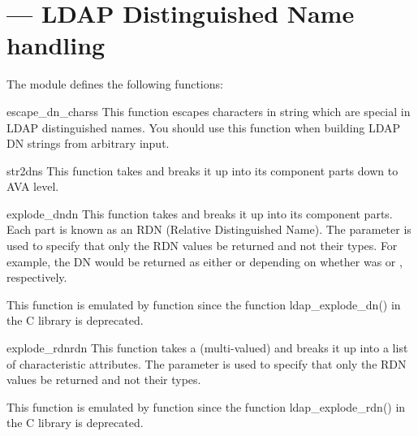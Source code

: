 
\section{ ---
  LDAP Distinguished Name handling }




\begin{seealso}
\end{seealso}

The  module defines the following functions:

\begin{funcdesc}{escape_dn_chars}{s} %
  This function escapes characters in string  which
  are special in LDAP distinguished names. You should use this function when
  building LDAP DN strings from arbitrary input.
\end{funcdesc}

\begin{funcdesc}{str2dn}{s} %
  This function takes  and breaks it up into its component parts
  down to AVA level.
\end{funcdesc}


\begin{funcdesc}{explode_dn}{dn } %
  This function takes  and breaks it up into its component parts. 
  Each part is known as an RDN (Relative Distinguished Name). The
   parameter is used to specify that only the RDN values be 
  returned and not their types.
  For example, the DN  would be
  returned as either \code{["cn=Bob", "c=US"]} or \code{["Bob","US"]}
  depending on whether  was  or ,
  respectively.

  This function is emulated by function 
  since the function ldap_explode_dn() in the C library is deprecated.
\end{funcdesc}

\begin{funcdesc}{explode_rdn}{rdn } %
  This function takes a (multi-valued)  and breaks it up
  into a list of characteristic attributes. The
   parameter is used to specify that only the RDN values be 
  returned and not their types.

  This function is emulated by function 
  since the function ldap_explode_rdn() in the C library is deprecated.
\end{funcdesc}

